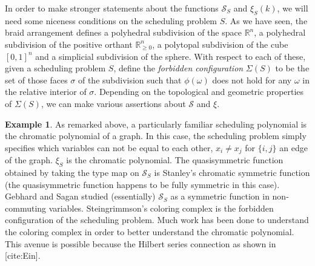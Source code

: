 \documentclass[12pt,reqno]{amsart}
\numberwithin{definition}{section}
\theoremstyle{definition}
\newtheorem{example}[definition]{Example}
\newcommand{\RR}{\mathbb{R}}
\newcommand{\SSS}{\mathcal{S}}
\begin{document}
In order to make stronger statements about the functions $\SSS_S$ and $\xi_S(k)$, we will need some niceness conditions on the scheduling problem $S$.  
As we have seen, the braid arrangement defines a polyhedral subdivision of the space
$\RR^n$, a polyhedral subdivision of the positive orthant $\RR_{\geq
  0}^n$, a polytopal subdivision of the cube $[0,1]^n$ and a simplicial subdivision of the sphere. With
respect to each of these, given a scheduling problem $S$, define the \emph{forbidden configuration}
$\Sigma(S)$ to be the set of those faces $\sigma$ of the subdivision
such that $\phi(\omega)$ does not hold for any $\omega$ in the
relative interior of $\sigma$. Depending on the topological and
geometric properties of $\Sigma(S)$, we can make various assertions
about $\SSS$ and $\xi$. 


\begin{example} As remarked above, a particularly familiar scheduling polynomial is the chromatic polynomial of a graph.  In this case, the scheduling problem simply specifies which variables can not be equal to each other, $x_i \neq x_j$ for $\{i,j\}$ an edge of the graph. $\xi_S$ is the chromatic polynomial.  The quasisymmetric function obtained by taking the type map on $\SSS_S$ is Stanley's chromatic symmetric function (the quasisymmetric function happens to be fully symmetric in this case).  Gebhard and Sagan studied (essentially) $\SSS_S$ as a symmetric function in non-commuting variables.  Steingrimmson's coloring complex is 
the forbidden configuration of the scheduling problem.  
Much work has been done to understand the coloring complex in order to better understand the chromatic polynomial.  This avenue is possible because the Hilbert series connection as shown in [cite:Ein].
\end{example}
\end{document}
